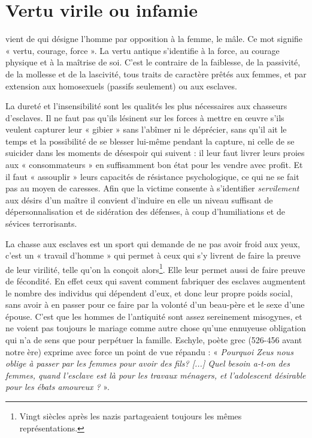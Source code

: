 \section{Vertu virile ou infamie}

  vient de  qui désigne l'homme par opposition à la femme, le mâle. Ce mot signifie « vertu, courage, force ». La vertu antique s'identifie à la force, au courage physique et à la maîtrise de soi. C'est le contraire de la faiblesse, de la passivité, de la mollesse et de la lascivité, tous traits de caractère prêtés aux femmes, et par extension aux homosexuels (passifs seulement) ou aux esclaves. 

 

 La dureté et l'insensibilité sont les qualités les plus nécessaires aux chasseurs d'esclaves. Il ne faut pas qu'ils lésinent sur les forces à mettre en œuvre s'ils veulent capturer leur « gibier » sans l'abîmer ni le déprécier, sans qu'il ait le temps et la possibilité de se blesser lui-même pendant la capture, ni celle de se suicider dans les moments de désespoir qui suivent : il leur faut livrer leurs proies aux « consommateurs » en suffisamment bon état pour les vendre avec profit. Et il faut « assouplir » leurs capacités de résistance psychologique, ce qui ne se fait pas au moyen de caresses. Afin que la victime consente à s'identifier \emph{servilement} aux désirs d'un maître il convient d'induire en elle un niveau suffisant de dépersonnalisation et de sidération des défenses, à coup d'humiliations et de sévices terrorisants. 

 La chasse aux esclaves est un sport qui demande de ne pas avoir froid aux yeux, c'est un « travail d'homme » qui permet à ceux qui s'y livrent de faire la preuve de leur virilité, telle qu'on la conçoit alors\footnote{Vingt siècles après les nazis partageaient toujours les mêmes représentations.}. Elle leur permet aussi de faire preuve de fécondité. En effet ceux qui savent comment fabriquer des esclaves augmentent le nombre des individus qui dépendent d'eux, et donc leur propre poids social, sans avoir à en passer pour ce faire par la volonté d'un beau-père et le sexe d'une épouse. C'est que les hommes de l'antiquité sont assez sereinement misogynes, et ne voient pas toujours le mariage comme autre chose qu'une ennuyeuse obligation qui n'a de sens que pour perpétuer la famille. Eschyle, poète grec (526-456 avant notre ère) exprime avec force un point de vue répandu : « \emph{Pourquoi Zeus nous oblige à passer par les femmes pour avoir des fils? \emph{[...]} Quel besoin a-t-on des femmes, quand l'esclave est là pour les travaux ménagers, et l'adolescent désirable pour les ébats amoureux ?} ». 

